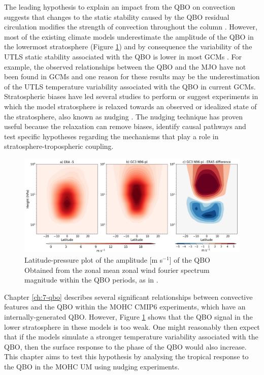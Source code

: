   
The leading hypothesis to explain an impact from the QBO on convection suggests that changes to the  static stability caused by the QBO residual circulation modifies the strength of convection throughout the column \citep{collimore2003,liess2012,nie2015}. 
However, most of the existing climate models underestimate the amplitude of the QBO in the lowermost stratosphere (Figure \ref{fig:qboamplitude}) and by consequence the variability of the UTLS static stability associated with the QBO is lower in most GCMs \citep{schenzinger2017,richter2020,bushell2020}. 
  For example, the observed relationships between the QBO and the MJO have not been found in GCMs \citep{lee2018,kim2020} and one reason for these results may be the underestimation of the UTLS temperature variability associated with the QBO in current GCMs.
   Stratospheric biases have led several studies to perform or suggest experiments in which the model stratosphere is relaxed towards an observed or idealized  state of the stratosphere, also known as nudging \citep[e.g.][]{garfinkel2011,lee2018,gray2020,richter2020,martin2021}. 
The nudging technique has proven useful because the relaxation can remove biases, identify causal pathways and test specific hypotheses regarding the mechanisms that play a role in stratosphere-tropospheric coupling. 

\begin{figure}[t!]
\centering
 \includegraphics[width=\linewidth]{figures/qboamplitude.png}
\caption[QBO amplitude bias]{Latitude-pressure plot of the amplitude [m s$^{-1}$] of the QBO  Obtained from the zonal mean zonal wind fourier spectrum magnitude within the QBO periods, as in \cite{schenzinger2017}. }
\label{fig:qboamplitude}
\end{figure}  

Chapter \ref{ch:7-qbo} describes several significant relationships between convective features and the QBO within the MOHC CMIP6 experiments, which have an internally-generated QBO. 
However, Figure \ref{fig:qboamplitude} shows that the QBO signal in the lower stratosphere in these models is too weak. %
One might reasonably then expect that if the models simulate a stronger temperature variability associated with the QBO, then the surface response to the phase of the QBO would also increase. 
This chapter aims to test this hypothesis by analysing the tropical response to the QBO in the MOHC UM using nudging experiments.

